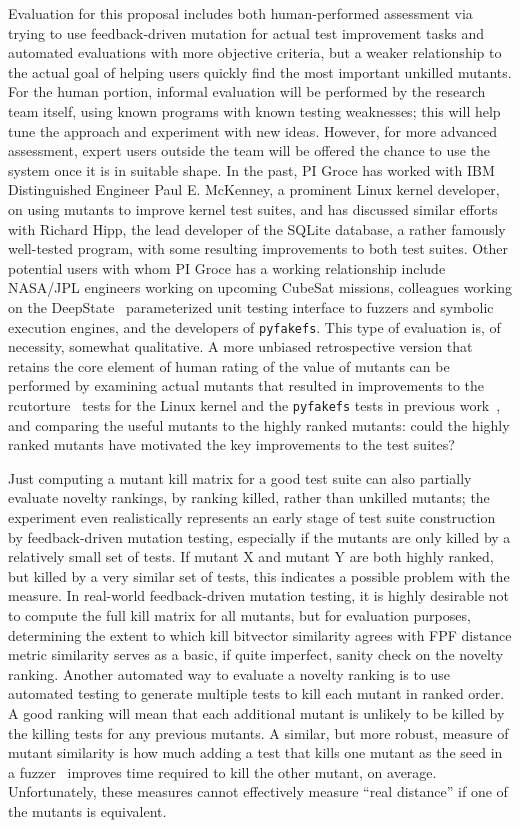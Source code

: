 Evaluation for this proposal includes both human-performed assessment
via trying to use feedback-driven mutation for actual test improvement
tasks and automated evaluations with more objective criteria, but a
weaker relationship to the actual goal of helping users quickly find
the most important unkilled mutants.  For the human portion, informal
evaluation will be performed by the research team itself, using known
programs with known testing weaknesses; this will help tune the
approach and experiment with new ideas.  However, for more advanced
assessment, expert users outside the team will be offered the chance
to use the system once it is in suitable shape.  In the past, PI Groce
has worked with IBM Distinguished Engineer Paul E. McKenney, a
prominent Linux kernel developer, on using mutants to improve kernel
test suites, and has discussed similar efforts with Richard Hipp, the
lead developer of the SQLite database, a rather famously well-tested
program, with some resulting improvements to both test suites.  Other
potential users with whom PI Groce has a working relationship include  NASA/JPL engineers working on upcoming CubeSat
missions, colleagues working on the DeepState~\cite{DeepState}
parameterized unit testing interface to fuzzers and symbolic execution
engines, and the developers of {\tt pyfakefs}.  This type of
evaluation is, of necessity, somewhat qualitative.  A more unbiased retrospective
version that retains the core element of human rating of the value of mutants can be performed by examining actual mutants that resulted in
improvements to the rcutorture~\cite{rcutorture} tests for the Linux
kernel and the {\tt pyfakefs} tests in previous
work~\cite{groce2018verified}, and comparing the useful mutants to the
highly ranked mutants:  could the highly ranked mutants have motivated
the key improvements to the test suites?

Just computing a mutant kill matrix for a good test suite can also
partially evaluate novelty rankings, by ranking
killed, rather than unkilled mutants; the experiment even
realistically represents an early stage of test suite construction by
feedback-driven mutation testing, especially if the mutants are only
killed by a relatively small set of tests.  If
mutant X and mutant Y are both highly ranked, but killed by a very
similar set of tests, this indicates a possible problem with the
measure.  In real-world feedback-driven mutation testing, it is highly
desirable not to compute the full kill matrix for all mutants, but
for evaluation purposes, determining the extent to which kill
bitvector similarity agrees with FPF distance metric similarity serves
as a basic, if quite imperfect, sanity check on the novelty ranking.
Another automated way to evaluate a novelty ranking is to use automated
testing to generate multiple tests to kill each mutant in ranked order.  A good ranking will mean
that each additional mutant is unlikely to be killed by the killing
tests for any previous mutants.  A similar, but more robust, measure of mutant similarity
is how much adding a test that kills one mutant as the seed in a
fuzzer~\cite{aflfuzz,libfuzzer} improves time required to kill the other
mutant, on average.  Unfortunately, these measures cannot effectively
measure ``real distance'' if one of the mutants is equivalent.

